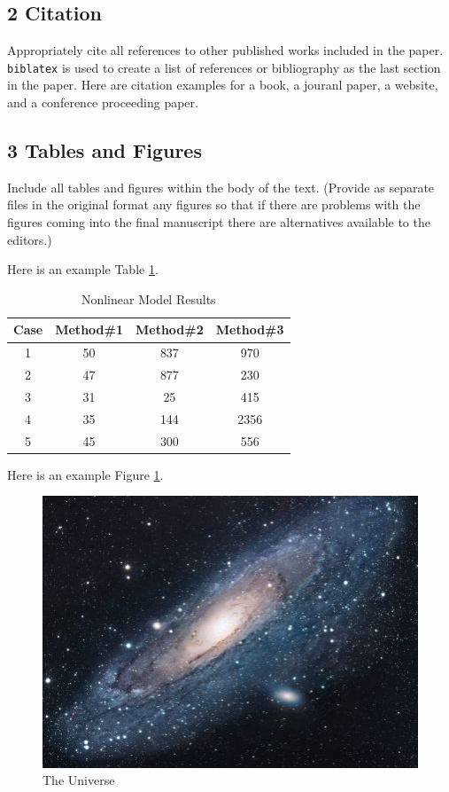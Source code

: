\documentclass[letter,12pt]{article}
\begin{document}
\subsection*{2 Citation}
Appropriately cite all references to other published works included in the paper. \texttt{biblatex} is used to create a list of references or bibliography as the last section in the paper. Here are citation examples for a book\cite{latexcompanion}, a jouranl paper\cite{einstein}, a website\cite{knuthwebsite}, and a conference proceeding paper\cite{maurer}.

\subsection*{3 Tables and Figures}
Include all tables and figures within the body of the text. (Provide as separate files in the original format any figures so that if there are problems with the figures coming into the final manuscript there are alternatives available to the editors.)

Here is an example Table \ref{table:nonlin}.

\begin{table}[ht]
\caption{Nonlinear Model Results} %
\label{table:nonlin} %
\centering %
\begin{tabular}{c c c c} %
\hline\hline %
Case & Method\#1 & Method\#2 & Method\#3 \\ [0.5ex] %
\hline %
1 & 50 & 837 & 970 \\ %
2 & 47 & 877 & 230 \\
3 & 31 & 25 & 415 \\
4 & 35 & 144 & 2356 \\
5 & 45 & 300 & 556 \\ [1ex] %
\hline %
\end{tabular}
\end{table}

Here is an example Figure \ref{figure:universe}.

\begin{figure}[h!]
\centering
\includegraphics[scale=1.7]{universe}
\caption{The Universe}
\label{figure:universe}
\end{figure}
\end{document}
